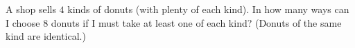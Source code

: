 A shop sells $4$ kinds of donuts (with plenty of each kind). In how many ways can I choose $8$ donuts if I must take at least one of each kind? (Donuts of the same kind are identical.)

